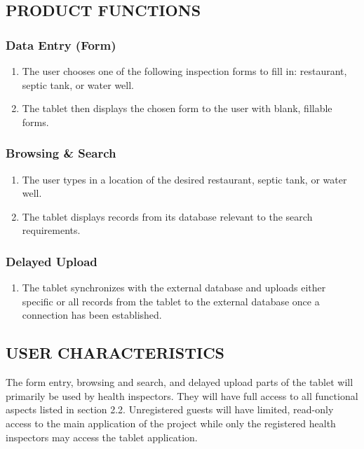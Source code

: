 \documentclass[twoside,letterpaper]{article}
\begin{document}
\subsection[PRODUCT
FUNCTIONS]{\rmfamily\bfseries\color{black}
PRODUCT FUNCTIONS}
\subsubsection{Data Entry (Form)}
\begin{enumerate}
\item{The user chooses one of the following inspection forms to fill in: restaurant, septic tank, or water well.}
\item{The tablet then displays the chosen form to the user with blank, fillable forms.}
\end{enumerate}
\subsubsection{Browsing \& Search}
\begin{enumerate}
\item{The user types in a location of the desired restaurant, septic tank, or water well.}
\item{The tablet displays records from its database relevant to the search requirements.}
\end{enumerate}
\subsubsection{Delayed Upload}
\begin{enumerate}
\item{The tablet synchronizes with the external database and uploads either specific or all records from the tablet to the external database once a connection has been established.}
\end{enumerate}

\subsection[USER
CHARACTERISTICS]{\rmfamily\bfseries\color{black}
USER CHARACTERISTICS}
{\rmfamily\color{black}
The form entry, browsing and search, and delayed upload parts of the tablet will primarily be used by health inspectors. They will have full access to all functional aspects listed in section 2.2. Unregistered guests will have limited, read-only access to the main application of the project while only the registered health inspectors may access the tablet application.}
\end{document}
